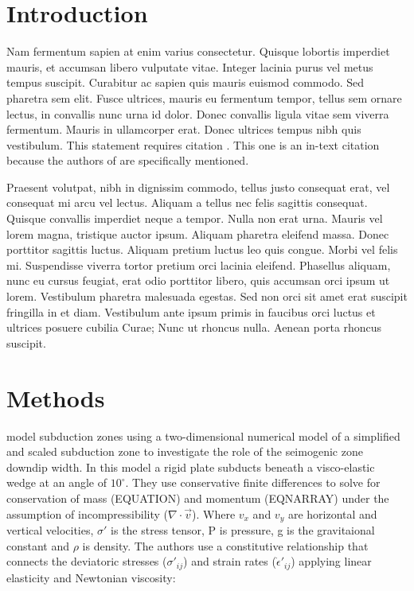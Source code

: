 \documentclass[draft,jgrga]{agutex}
\begin{document}
\section{Introduction}

Nam fermentum sapien at enim varius consectetur. Quisque lobortis imperdiet mauris, et accumsan libero vulputate vitae. Integer lacinia purus vel metus tempus suscipit. Curabitur ac sapien quis mauris euismod commodo. Sed pharetra sem elit. Fusce ultrices, mauris eu fermentum tempor, tellus sem ornare lectus, in convallis nunc urna id dolor. Donec convallis ligula vitae sem viverra fermentum. Mauris in ullamcorper erat. Donec ultrices tempus nibh quis vestibulum. This statement requires citation \citep{Goldfinger2013}. This one is an in-text citation because the authors of \citet{Herrendorfer2015} are specifically mentioned.

Praesent volutpat, nibh in dignissim commodo, tellus justo consequat erat, vel consequat mi arcu vel lectus. Aliquam a tellus nec felis sagittis consequat. Quisque convallis imperdiet neque a tempor. Nulla non erat urna. Mauris vel lorem magna, tristique auctor ipsum. Aliquam pharetra eleifend massa. Donec porttitor sagittis luctus. Aliquam pretium luctus leo quis congue. Morbi vel felis mi. Suspendisse viverra tortor pretium orci lacinia eleifend. Phasellus aliquam, nunc eu cursus feugiat, erat odio porttitor libero, quis accumsan orci ipsum ut lorem. Vestibulum pharetra malesuada egestas. Sed non orci sit amet erat suscipit fringilla in et diam. Vestibulum ante ipsum primis in faucibus orci luctus et ultrices posuere cubilia Curae; Nunc ut rhoncus nulla. Aenean porta rhoncus suscipit.


\section{Methods}

\citet{Herrendorfer2015} model subduction zones using a two-dimensional numerical model of a simplified and scaled subduction zone to investigate the role of the seimogenic zone downdip width. In this model a rigid plate subducts beneath a visco-elastic wedge at an angle of $10^\circ$. They use conservative finite differences to solve for conservation of mass (EQUATION) and momentum (EQNARRAY) under the assumption of incompressibility ($\nabla \cdot \vec{v}$). Where $v_x$ and $v_y$ are horizontal and vertical velocities, $\sigma'$ is the stress tensor, P is pressure, g is the gravitaional constant and $\rho$ is density. The authors use a constitutive relationship that connects the deviatoric stresses ($\sigma'_{ij}$) and strain rates ($\dot{\epsilon}'_{ij}$) applying linear elasticity and Newtonian viscosity:
\end{document}
